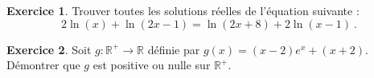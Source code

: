 \documentclass[a4paper, 11pt,openany]{article}%
\theoremstyle{plain}
\theoremstyle{definition}
\newtheorem{exo}{Exercice}
\newtheorem{sol}{Solution de l'exercice}
\theoremstyle{remark}
\newcommand{\R}{\mathbb{R}}
\begin{document}
\begin{exo}
	Trouver toutes les solutions réelles de l'équation suivante :
	\[
		2 \ln (x) +\ln(2x-1) = \ln(2x+8) + 2\ln(x-1) \ .
	\]
\end{exo}


   



\begin{exo}
Soit $g:\R^+ \to \R$ définie par $g(x)=(x-2)e^x+(x+2)$. Démontrer que $g$ est positive ou nulle sur $\R^+$.
\end{exo}

%
\end{document}
